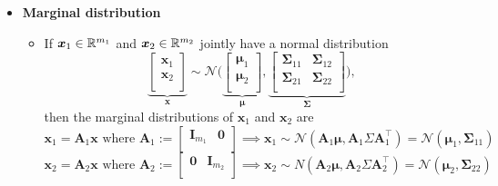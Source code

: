 \documentclass[12pt,a4paper]{article}
\begin{document}
\begin{itemize}

\item \textbf{Marginal distribution}

  \begin{itemize}

  \item If $\bm{x}_{1}\in \mathbb{R}^{m_{1}}$ and $\bm{x}_{2}\in \mathbb{R}^{m_{2}}$ jointly have a normal distribution
    \begin{equation}\label{eq:x1x2normal}%
      \underbrace{
      \begin{bmatrix}
        \bm{x}_{1}\\
        \bm{x}_{2}\\
      \end{bmatrix}}_{\bm{x}}
      \sim \mathcal{N} \bigg(
        \underbrace{\begin{bmatrix}
          \bm{\mu}_{1} \\
          \bm{\mu}_{2} \\
        \end{bmatrix}}_{\bm{\mu}},
      \underbrace{
        \begin{bmatrix}
          \bm{\Sigma}_{11} & \bm{\Sigma}_{12} \\
          \bm{\Sigma}_{21} & \bm{\Sigma}_{22} \\
        \end{bmatrix}}_{\bm{\Sigma}}
      \bigg),
    \end{equation}
    then the marginal distributions of $\bm{x}_{1}$ and $\bm{x}_{2}$ are
    \begin{equation}\nonumber%
      \bm{x}_{1} = \bm{A}_{1}\bm{x}
      \,\,\text{where}\,\,
      \bm{A}_{1}:=
      \begin{bmatrix}
        \bm{I}_{m_{1}} & \bm{0} \\
      \end{bmatrix}
      \implies
      \bm{x}_{1}
      \sim \mathcal{N}(\bm{A}_{1}\bm{\mu}, \bm{A}_{1}\Sigma \bm{A}_{1}^{\top})
      = \mathcal{N}(\bm{\mu}_{1}, \bm{\Sigma}_{11})
    \end{equation}
    \begin{equation}\nonumber%
      \bm{x}_{2} = \bm{A}_{2}\bm{x}
      \,\,\text{where}\,\,
      \bm{A}_{2}:=
      \begin{bmatrix}
        \bm{0} & \bm{I}_{m_{2}}\\
      \end{bmatrix}
      \implies
      \bm{x}_{2}
      \sim N(\bm{A}_{2}\bm{\mu}, \bm{A}_{2}\Sigma \bm{A}_{2}^{\top})
      = \mathcal{N}(\bm{\mu}_{2}, \bm{\Sigma}_{22})
    \end{equation}


\end{itemize}
\end{itemize}
\end{document}
